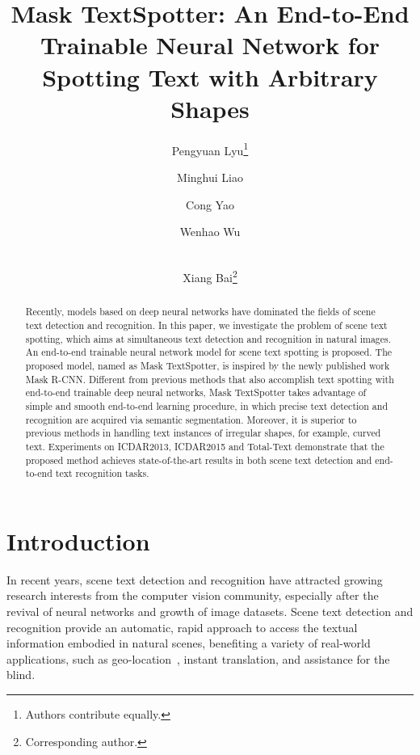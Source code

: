 \documentclass[runningheads]{llncs}
\makeatletter
\newcommand{\printfnsymbol}[1]{%
  \textsuperscript{\@fnsymbol{#1}}%
}
\makeatother
\begin{document}
\title{Mask TextSpotter: An End-to-End Trainable Neural Network for Spotting Text with Arbitrary Shapes} 

\author{Pengyuan Lyu\thanks{Authors contribute equally.} \and
Minghui Liao\printfnsymbol{1} \and
Cong Yao \and
Wenhao Wu \and \\
Xiang Bai\thanks{Corresponding author.}}

\maketitle              %
\begin{abstract}
Recently, models based on deep neural networks have dominated the fields of scene text detection and recognition. In this paper, we investigate the problem of scene text spotting, which aims at simultaneous text detection and recognition in natural images. An end-to-end trainable neural network model for scene text spotting is proposed. The proposed model, named as Mask TextSpotter, is inspired by the newly published work Mask R-CNN. Different from previous methods that also accomplish text spotting with end-to-end trainable deep neural networks, Mask TextSpotter takes advantage of simple and smooth end-to-end learning procedure, in which precise text detection and recognition are acquired via semantic segmentation. Moreover, it is superior to previous methods in handling text instances of irregular shapes, for example, curved text. Experiments on ICDAR2013, ICDAR2015 and Total-Text demonstrate that the proposed method achieves state-of-the-art results in both scene text detection and end-to-end text recognition tasks.

\end{abstract}

\section{Introduction}
In recent years, scene text detection and recognition have attracted growing research interests from the computer vision community, especially after the revival of neural networks and growth of image datasets. Scene text detection and recognition provide an automatic, rapid approach to access the textual information embodied in natural scenes, benefiting a variety of real-world applications, such as geo-location~\cite{zhu2018cascaded}, instant translation, and assistance for the blind.  
\end{document}

